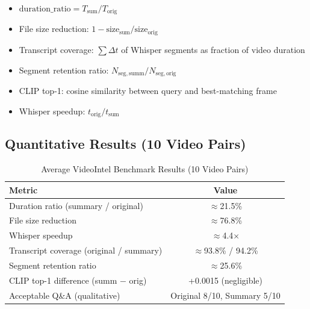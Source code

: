 \documentclass[10pt,conference]{IEEEtran}
\begin{document}
\begin{itemize}
  \item $\mathrm{duration\_ratio} = T_{\mathrm{sum}} / T_{\mathrm{orig}}$
  \item File size reduction: $1 - \mathrm{size}_{\mathrm{sum}} /
        \mathrm{size}_{\mathrm{orig}}$
  \item Transcript coverage: $\sum \Delta t$ of Whisper segments as fraction
        of video duration
  \item Segment retention ratio:
        $N_{\mathrm{seg,summ}} / N_{\mathrm{seg,orig}}$
  \item CLIP top-1: cosine similarity between query and best-matching frame
  \item Whisper speedup: $t_{\mathrm{orig}} / t_{\mathrm{sum}}$
\end{itemize}

\subsection{Quantitative Results (10 Video Pairs)}

\begin{table}[H]
\centering
\caption{Average VideoIntel Benchmark Results (10 Video Pairs)}
\label{tab:vi_avg}
\begin{tabular}{lc}
\toprule
\textbf{Metric} & \textbf{Value} \\
\midrule
Duration ratio (summary / original)             & $\approx$21.5\%  \\
File size reduction                              & $\approx$76.8\%  \\
Whisper speedup                                  & $\approx$4.4$\times$ \\
Transcript coverage (original / summary)         & $\approx$93.8\% / 94.2\% \\
Segment retention ratio                          & $\approx$25.6\%  \\
CLIP top-1 difference (summ $-$ orig)            & +0.0015 (negligible) \\
Acceptable Q\&A (qualitative)                    & Original 8/10, Summary 5/10 \\
\bottomrule
\end{tabular}
\end{table}
\end{document}
